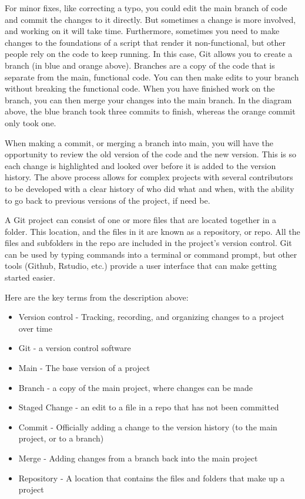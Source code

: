 \documentclass[
  letterpaper,
  DIV=11,
  numbers=noendperiod]{scrreprt}
\begin{document}
For minor fixes, like correcting a typo, you could edit the main branch
of code and commit the changes to it directly. But sometimes a change is
more involved, and working on it will take time. Furthermore, sometimes
you need to make changes to the foundations of a script that render it
non-functional, but other people rely on the code to keep running. In
this case, Git allows you to create a branch (in blue and orange above).
Branches are a copy of the code that is separate from the main,
functional code. You can then make edits to your branch without breaking
the functional code. When you have finished work on the branch, you can
then merge your changes into the main branch. In the diagram above, the
blue branch took three commits to finish, whereas the orange commit only
took one.

When making a commit, or merging a branch into main, you will have the
opportunity to review the old version of the code and the new version.
This is so each change is highlighted and looked over before it is added
to the version history. The above process allows for complex projects
with several contributors to be developed with a clear history of who
did what and when, with the ability to go back to previous versions of
the project, if need be.

A Git project can consist of one or more files that are located together
in a folder. This location, and the files in it are known as a
repository, or repo. All the files and subfolders in the repo are
included in the project's version control. Git can be used by typing
commands into a terminal or command prompt, but other tools (Github,
Rstudio, etc.) provide a user interface that can make getting started
easier.

Here are the key terms from the description above:

\begin{itemize}
\item
  Version control - Tracking, recording, and organizing changes to a
  project over time
\item
  Git - a version control software
\item
  Main - The base version of a project
\item
  Branch - a copy of the main project, where changes can be made
\item
  Staged Change - an edit to a file in a repo that has not been
  committed
\item
  Commit - Officially adding a change to the version history (to the
  main project, or to a branch)
\item
  Merge - Adding changes from a branch back into the main project
\item
  Repository - A location that contains the files and folders that make
  up a project
\end{itemize}
\end{document}
